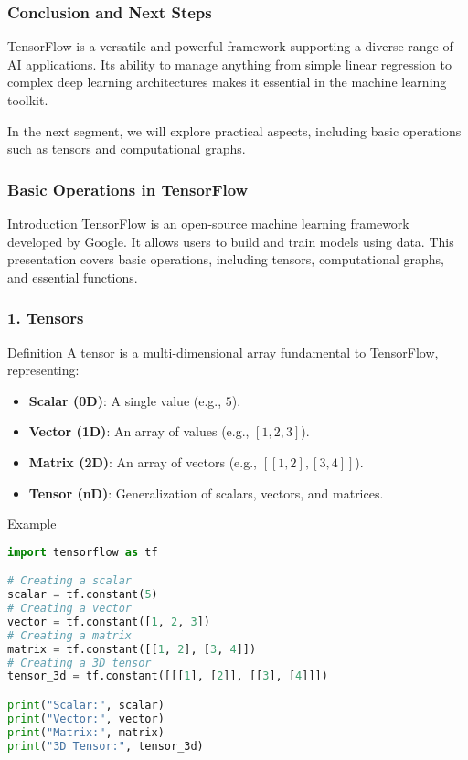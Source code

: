 \documentclass[aspectratio=169]{beamer}
\begin{document}
\begin{frame}[fragile]
    \frametitle{Conclusion and Next Steps}
    TensorFlow is a versatile and powerful framework supporting a diverse range of AI applications. Its ability to manage anything from simple linear regression to complex deep learning architectures makes it essential in the machine learning toolkit. 

    In the next segment, we will explore practical aspects, including basic operations such as tensors and computational graphs.
\end{frame}

\begin{frame}
    \frametitle{Basic Operations in TensorFlow}
    \begin{block}{Introduction}
        TensorFlow is an open-source machine learning framework developed by Google. It allows users to build and train models using data. This presentation covers basic operations, including tensors, computational graphs, and essential functions.
    \end{block}
\end{frame}

\begin{frame}[fragile]
    \frametitle{1. Tensors}
    \begin{block}{Definition}
        A tensor is a multi-dimensional array fundamental to TensorFlow, representing:
    \end{block}
    \begin{itemize}
        \item \textbf{Scalar (0D)}: A single value (e.g., \(5\)).
        \item \textbf{Vector (1D)}: An array of values (e.g., \([1, 2, 3]\)).
        \item \textbf{Matrix (2D)}: An array of vectors (e.g., \([[1, 2], [3, 4]]\)).
        \item \textbf{Tensor (nD)}: Generalization of scalars, vectors, and matrices.
    \end{itemize}
    \begin{block}{Example}
        \begin{lstlisting}[language=Python]
import tensorflow as tf

# Creating a scalar
scalar = tf.constant(5)
# Creating a vector
vector = tf.constant([1, 2, 3])
# Creating a matrix
matrix = tf.constant([[1, 2], [3, 4]])
# Creating a 3D tensor
tensor_3d = tf.constant([[[1], [2]], [[3], [4]]])

print("Scalar:", scalar)
print("Vector:", vector)
print("Matrix:", matrix)
print("3D Tensor:", tensor_3d)
        \end{lstlisting}
    \end{block}
\end{frame}
\end{document}
